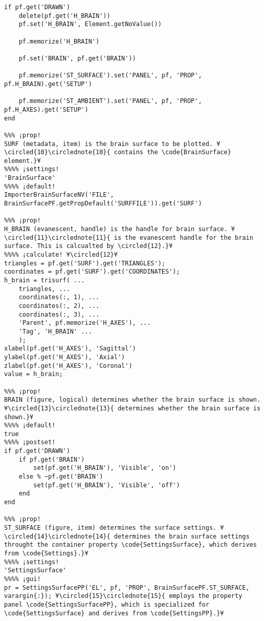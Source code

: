 \documentclass{tufte-handout}
\begin{document}
\begin{lstlisting}
if pf.get('DRAWN')
    delete(pf.get('H_BRAIN'))
    pf.set('H_BRAIN', Element.getNoValue())

    pf.memorize('H_BRAIN')

    pf.set('BRAIN', pf.get('BRAIN'))

    pf.memorize('ST_SURFACE').set('PANEL', pf, 'PROP', pf.H_BRAIN).get('SETUP')

    pf.memorize('ST_AMBIENT').set('PANEL', pf, 'PROP', pf.H_AXES).get('SETUP')
end

%%% ¡prop!
SURF (metadata, item) is the brain surface to be plotted. ¥\circled{10}\circlednote{10}{ contains the \code{BrainSurface} element.}¥
%%%% ¡settings!
'BrainSurface'
%%%% ¡default!
ImporterBrainSurfaceNV('FILE', BrainSurfacePF.getPropDefault('SURFFILE')).get('SURF')

%%% ¡prop!
H_BRAIN (evanescent, handle) is the handle for brain surface. ¥\circled{11}\circlednote{11}{ is the evanescent handle for the brain surface. This is calcualted by \circled{12}.}¥
%%%% ¡calculate! ¥\circled{12}¥
triangles = pf.get('SURF').get('TRIANGLES');
coordinates = pf.get('SURF').get('COORDINATES');
h_brain = trisurf( ...
    triangles, ...
    coordinates(:, 1), ...
    coordinates(:, 2), ...
    coordinates(:, 3), ...
    'Parent', pf.memorize('H_AXES'), ...
    'Tag', 'H_BRAIN' ...
    );
xlabel(pf.get('H_AXES'), 'Sagittal')
ylabel(pf.get('H_AXES'), 'Axial')
zlabel(pf.get('H_AXES'), 'Coronal')
value = h_brain;

%%% ¡prop!
BRAIN (figure, logical) determines whether the brain surface is shown. ¥\circled{13}\circlednote{13}{ determines whether the brain surface is shown.}¥
%%%% ¡default!
true
%%%% ¡postset!
if pf.get('DRAWN')
    if pf.get('BRAIN')
        set(pf.get('H_BRAIN'), 'Visible', 'on')
    else % ~pf.get('BRAIN') 
        set(pf.get('H_BRAIN'), 'Visible', 'off')
    end
end

%%% ¡prop!
ST_SURFACE (figure, item) determines the surface settings. ¥\circled{14}\circlednote{14}{ determines the brain surface settings throught the container property \code{SettingsSurface}, which derives from \code{Settings}.}¥
%%%% ¡settings!
'SettingsSurface'
%%%% ¡gui!
pr = SettingsSurfacePP('EL', pf, 'PROP', BrainSurfacePF.ST_SURFACE, varargin{:}); ¥\circled{15}\circlednote{15}{ employs the property panel \code{SettingsSurfacePP}, which is specialized for \code{SettingsSurface} and derives from \code{SettingsPP}.}¥


\end{lstlisting}
\end{document}
